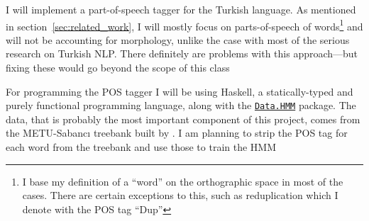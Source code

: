 \documentclass{article}
\newcommand{\hmmURL}{https://hackage.haskell.org/package/hmm-0.2.1.1/docs/Data-HMM.html}
\begin{document}
I will implement a part-of-speech tagger for the Turkish language. As
mentioned in section~\ref{sec:related_work}, I will mostly focus on parts-of-speech
of words\footnote{I base my definition of a ``word'' on the orthographic space in
  most of the cases. There are certain exceptions to this, such as
  reduplication which I denote with the POS tag ``Dup''} and will not be accounting for morphology, unlike
the case with most of the serious research on Turkish NLP. There definitely are
problems with this approach---but fixing these would go beyond the scope of
this class

For programming the POS tagger I will be using Haskell, a statically-typed and purely
functional programming language, along with the
\href{\hmmURL}{\texttt{Data.HMM}} package.
The data, that is probably the most important component of this
project, comes from the METU-Sabanc{\i} treebank built by
\citet{oflazer2003building}.  I am planning to strip the POS tag for each word from
the treebank and use those to train the HMM



\end{document}
